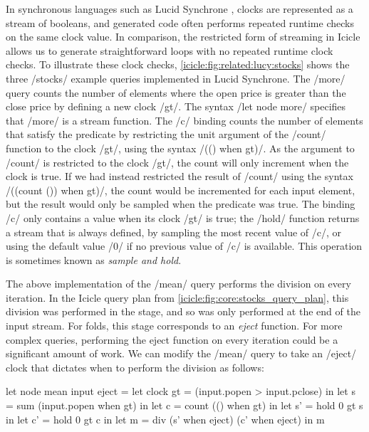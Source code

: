 In synchronous languages such as Lucid Synchrone \citep{caspi1995functional}, clocks are represented as a stream of booleans, and generated code often performs repeated runtime checks on the same clock value.
In comparison, the restricted form of streaming in Icicle allows us to generate straightforward loops with no repeated runtime clock checks.
To illustrate these clock checks, \cref{icicle:fig:related:lucy:stocks} shows the three \Lucy/stocks/ example queries implemented in Lucid Synchrone.
The \Lucy/more/ query counts the number of elements where the open price is greater than the close price by defining a new clock \Lucy/gt/.
The syntax \Lucy/let node more/ specifies that \Lucy/more/ is a stream function.
The \Lucy/c/ binding counts the number of elements that satisfy the predicate by restricting the unit argument of the \Lucy/count/ function to the clock \Lucy/gt/, using the syntax \Lucy/(() when gt)/.
As the argument to \Lucy/count/ is restricted to the clock \Lucy/gt/, the count will only increment when the clock is true.
If we had instead restricted the result of \Lucy/count/ using the syntax \Lucy/((count ()) when gt)/, the count would be incremented for each input element, but the result would only be sampled when the predicate was true.
The binding \Lucy/c/ only contains a value when its clock \Lucy/gt/ is true; the \Lucy/hold/ function returns a stream that is always defined, by sampling the most recent value of \Lucy/c/, or using the default value \Lucy/0/ if no previous value of \Lucy/c/ is available.
This operation is sometimes known as \emph{sample and hold}.

The above implementation of the \Lucy/mean/ query performs the division on every iteration.
In the Icicle query plan from \cref{icicle:fig:core:stocks_query_plan}, this division was performed in the \IcC@after@ stage, and so was only performed at the end of the input stream.
For folds, this \IcC@after@ stage corresponds to an \emph{eject} function.
For more complex queries, performing the eject function on every iteration could be a significant amount of work.
We can modify the \Lucy/mean/ query to take an \Lucy/eject/ clock that dictates when to perform the division as follows:

\begin{lucy}
let node mean input eject =
 let clock gt = (input.popen > input.pclose)
 in let s     = sum (input.popen when gt)
 in let c     = count (() when gt)
 in let s'    = hold 0 gt s
 in let c'    = hold 0 gt c
 in let m     = div (s' when eject) (c' when eject)
 in m
\end{lucy}


